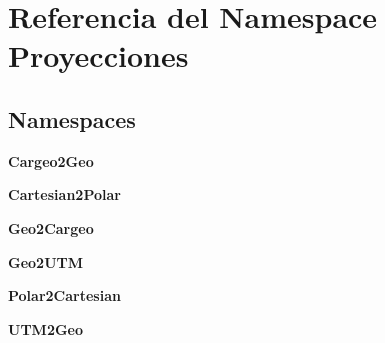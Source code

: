 \section{Referencia del Namespace Proyecciones}
\label{namespaceProyecciones}
\subsection*{Namespaces}
\begin{DoxyCompactItemize}
\item 
{\bf Cargeo2\-Geo}
\item 
{\bf Cartesian2\-Polar}
\item 
{\bf Geo2\-Cargeo}
\item 
{\bf Geo2\-U\-T\-M}
\item 
{\bf Polar2\-Cartesian}
\item 
{\bf U\-T\-M2\-Geo}
\end{DoxyCompactItemize}
